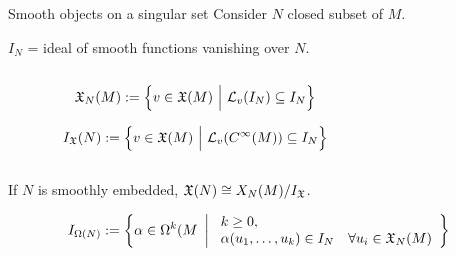 \documentclass[beamer,10pt]{standalone}
\begin{document}
\begin{frame}[shrink]{Smooth objects on a singular set}
	Consider $N$ closed subset of $M$.
	\vfill
	\pause
	\begin{defblock}
	 $I_N$ = ideal of smooth functions vanishing over $N$.
	\end{defblock}
	\vfill
	\pause

	\begin{columns}[T]
		\setlength{\belowdisplayskip}{5pt}
		\begin{column}{.65\linewidth}
			\centering \it
				\begin{defblock}[v.f tangent to $N$]
					\begin{displaymath}
						\mathfrak{X}_N(M):=
						\left\lbrace
							v \in \mathfrak{X}(M)
						~\Big\vert~
							\mathcal{L}_v(I_N) \subseteq I_N
						\right\rbrace
					\end{displaymath}
				\end{defblock}
				\begin{defblock}[v.f vanishing on $N$]
					\begin{displaymath}
						I_{\mathfrak{X}}(N):=
						\left\lbrace
							v \in \mathfrak{X}(M)
						~\Big\vert~
							\mathcal{L}_v(C^\infty(M)) \subseteq I_N
						\right\rbrace
					\end{displaymath}				
				\end{defblock}				
		\end{column}	
		\begin{column}{.35\linewidth}
			\centering 
						
		\end{column}	
	\end{columns}			
	\pause


		\begin{tcolorbox}[
		enhanced,frame hidden,borderline={0.5pt}{0pt}{blue},
		arc=5pt,colback=white,
		colbacktitle=white,]
			 If $N$ is smoothly embedded,  $\mathfrak{X}(N)\cong {X_N(M)}/{I_{\mathfrak{X}}}$.
		\end{tcolorbox}

		\pause

		\begin{defblock}
			\begin{displaymath}
				I_{\Omega(N)}:=
				\left\lbrace
					\alpha\in\Omega^k(M
				~\left\vert~
					\begin{array}{l r}
						k\geq 0,~		\\		
						\alpha(u_1,\ldots,u_k) \in I_N & \forall u_i \in\mathfrak{X}_N(M)
					\end{array}
				\right\rbrace\right.
			\end{displaymath}
		\end{defblock}

\end{frame}
\end{document}
